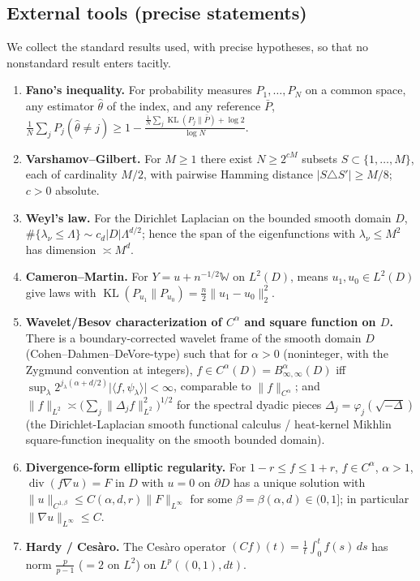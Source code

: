 \documentclass[11pt]{article}
\theoremstyle{remark}
\newcommand{\W}{\mathbb{W}}
\newcommand{\norm}[1]{\lVert #1\rVert}
\newcommand{\abs}[1]{\lvert #1\rvert}
\newcommand{\inner}[2]{\langle #1,#2\rangle}
\newcommand{\SET}[1]{\{#1\}}
\DeclareMathOperator{\diver}{div}
\begin{document}
\subsection{External tools (precise statements)}
We collect the standard results used, with precise hypotheses, so that no
nonstandard result enters tacitly.


\begin{enumerate}[label=(T\arabic*),itemsep=1pt,leftmargin=2.2em]
\item\label{T:fano}\textbf{Fano's inequality.} For probability measures
$P_1,\dots,P_N$ on a common space, any estimator $\widehat\theta$ of the
index, and any reference $\bar P$,
$\frac1N\sum_{j} P_j(\widehat\theta\ne j)\ge 1-\frac{\frac1N\sum_j
\operatorname{KL}(P_j\|\bar P)+\log 2}{\log N}$.
\item\label{T:VG}\textbf{Varshamov--Gilbert.} For $M\ge1$ there exist
$N\ge 2^{cM}$ subsets $S\subset\SET{1,\dots,M}$, each of cardinality $M/2$,
with pairwise Hamming distance $\abs{S\triangle S'}\ge M/8$; $c>0$
absolute.
\item\label{T:weyl}\textbf{Weyl's law.} For the Dirichlet Laplacian on the
bounded smooth domain $D$, $\#\SET{\lambda_\nu\le\Lambda}\sim
c_d\abs D\Lambda^{d/2}$; hence the span of the eigenfunctions with
$\lambda_\nu\le M^2$ has dimension $\asymp M^{d}$.
\item\label{T:CM}\textbf{Cameron--Martin.} For $Y=u+n^{-1/2}\W$ on
$L^2(D)$, means $u_1,u_0\in L^2(D)$ give laws with
$\operatorname{KL}(P_{u_1}\|P_{u_0})=\frac{n}{2}\norm{u_1-u_0}_2^2$.
\item\label{T:wave}\textbf{Wavelet/Besov characterization of $C^\alpha$
and square function on $D$.} There is a boundary-corrected wavelet frame of
the smooth domain $D$ (Cohen--Dahmen--DeVore-type) such that for
$\alpha>0$ (noninteger, with the Zygmund convention at integers),
$f\in C^\alpha(D)=B^\alpha_{\infty,\infty}(D)$ iff
$\sup_{\lambda}2^{j_\lambda(\alpha+d/2)}\abs{\inner{f}{\psi_\lambda}}
<\infty$, comparable to $\norm{f}_{C^\alpha}$; and
$\norm{f}_{L^2}\asymp\bigl(\sum_j\norm{\Delta_j f}_{L^2}^2\bigr)^{1/2}$ for
the spectral dyadic pieces $\Delta_j=\varphi_j(\sqrt{-\Delta})$ (the
Dirichlet-Laplacian smooth functional calculus / heat-kernel Mikhlin
square-function inequality on the smooth bounded domain).
\item\label{T:schauder}\textbf{Divergence-form elliptic regularity.} For
$1-r\le f\le1+r$, $f\in C^\alpha$, $\alpha>1$, $\diver(f\nabla u)=F$ in
$D$ with $u=0$ on $\partial D$ has a unique solution with
$\norm{u}_{C^{1,\beta}}\le C(\alpha,d,r)\norm{F}_{L^\infty}$ for some
$\beta=\beta(\alpha,d)\in(0,1]$; in particular
$\norm{\nabla u}_{L^\infty}\le C$.
\item\label{T:hardy}\textbf{Hardy / Ces\`aro.} The Ces\`aro operator
$(Cf)(t)=\frac1t\int_0^t f(s)\,ds$ has norm $\frac{p}{p-1}$ ($=2$ on $L^2$)
on $L^p((0,1),dt)$.
\end{enumerate}
\end{document}
